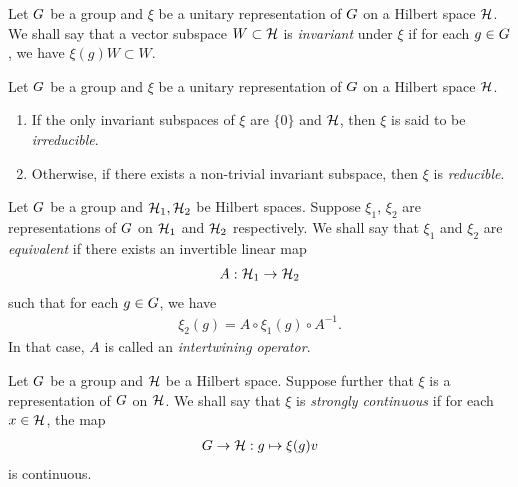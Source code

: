 \begin{definition}
\label{definition:invariant_subspaces}
    Let $G$ be a group and $\xi$ be a unitary representation of $G$ on a Hilbert space $\mathcal{H}$.
    We shall say that a vector subspace $W \subset \mathcal{H}$ is \emph{invariant} under $\xi$
    if for each $g \in G$, we have $\xi(g) W \subset W$.
\end{definition}

\begin{definition}[Irreducibility]
\label{definition:irreducible_representations}
    Let $G$ be a group and $\xi$ be a unitary representation of $G$ on a Hilbert space $\mathcal{H}$.
    \begin{enumerate}
        \item If the only invariant subspaces of $\xi$ are $\{0\}$ and $\mathcal{H}$,
            then $\xi$ is said to be \emph{irreducible}.
        \item Otherwise, if there exists a non-trivial invariant subspace,
            then $\xi$ is \emph{reducible}.
    \end{enumerate}
\end{definition}

\begin{definition}
\label{definition:equivalent_representations}
    Let $G$ be a group and $\mathcal{H}_1, \mathcal{H}_2$ be Hilbert spaces.
    Suppose $\xi_1$, $\xi_2$ are representations of $G$ on $\mathcal{H}_1$ and $\mathcal{H}_2$ respectively.
    We shall say that $\xi_1$ and $\xi_2$ are \emph{equivalent}
    if there exists an invertible linear map
    \begin{align*}
        A : \mathcal{H}_1 \to \mathcal{H}_2
    \end{align*}
    such that for each $g \in G$, we have
    \begin{align*}
        \xi_2(g) = A \circ \xi_1(g) \circ A^{-1}.
    \end{align*}
    In that case, $A$ is called an \emph{intertwining operator}.
\end{definition}

\begin{definition}
\label{definition:strongly_continuous_representation}
    Let $G$ be a group and $\mathcal{H}$ be a Hilbert space.
    Suppose further that $\xi$ is a representation of $G$ on $\mathcal{H}$.
    We shall say that $\xi$ is \emph{strongly continuous}
    if for each $x \in \mathcal{H}$,
    the map
    \begin{align*}
        G \to \mathcal{H} : g \mapsto \xi(g) v
    \end{align*}
    is continuous.
\end{definition}

